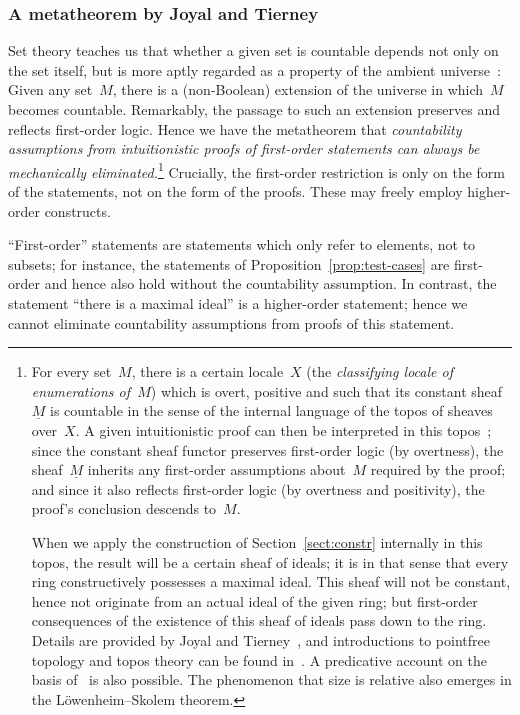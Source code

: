 \documentclass[envcountsect,envcountsame,runningheads]{llncs}
\renewcommand{\_}{\mathpunct{.}\,}
\begin{document}
\subsubsection{A metatheorem by Joyal and Tierney}

Set theory teaches us that
whether a given set is countable depends not only on the set itself, but is
more aptly regarded as a property of the ambient universe~\cite{hamkins:multiverse}: Given any
set~$M$, there is a (non-Boolean) extension of the universe in which~$M$ becomes countable.
Remarkably, the passage to such an extension preserves and reflects
first-order logic.
Hence we have the metatheorem that \emph{countability assumptions from
intuitionistic proofs of first-order statements can always be mechanically
eliminated.}\footnote{For every set~$M$, there is a certain locale~$X$ (the
\emph{classifying locale of enumerations of~$M$}) which is overt, positive and such
that its constant sheaf~$\underline{M}$ is countable in the sense of the
internal language of the topos of sheaves over~$X$. A given
intuitionistic proof can then be interpreted in this topos~\cite{caramello:preliminaries,maietti:modular,shulman:categorical-logic}; since the constant
sheaf functor preserves first-order logic (by overtness), the
sheaf~$\underline{M}$ inherits any first-order assumptions about~$M$ required
by the proof; and since it also reflects first-order logic (by overtness and
positivity), the proof's conclusion descends to~$M$.\par When we apply the
construction of Section~\ref{sect:constr} internally in this topos, the result
will be a certain sheaf of ideals; it is in that sense that every ring
constructively possesses a maximal ideal. This sheaf will not be constant,
hence not originate from an actual ideal of the given ring; but first-order
consequences of the existence of this sheaf of ideals pass down to the ring.
Details are provided by Joyal and
Tierney~\cite[pp.~36f.]{joyal-tierney:grothendieck}, and introductions to
pointfree topology and topos theory can be found
in~\cite{blechschmidt:generalized-spaces,johnstone:point,vickers:continuity,vickers:locales-toposes}. A predicative account on the basis of~\cite{maietti:au,vickers:sketches,crosilla:predicativity}
is also possible. The phenomenon that size is relative also emerges in the
Löwenheim--Skolem theorem.} Crucially, the first-order restriction is only on the form
of the statements, not on the form of the proofs. These may freely employ higher-order constructs.

``First-order'' statements are statements which only refer to elements, not to
subsets; for instance, the statements of Proposition~\ref{prop:test-cases} are
first-order and hence also hold without the countability assumption.
In contrast, the statement ``there is a maximal ideal'' is a higher-order
statement; hence we cannot eliminate countability assumptions from proofs of
this statement.
\end{document}
